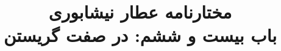 \documentclass[14pt,b5paper]{article}
\begin{document}
\title{\Huge مختارنامه عطار نیشابوری \\
باب بیست و ششم: در صفت گریستن}
\author{ }
\date{ }
\maketitle
\newpage
\tableofcontents
\newpage

\newpage

\newpage

\newpage

\newpage

\newpage

\newpage

\newpage

\newpage

\newpage

\newpage

\newpage

\newpage

\newpage

\newpage

\newpage

\newpage

\newpage

\newpage

\newpage

\newpage

\newpage

\newpage

\newpage

\newpage

\newpage

\newpage

\newpage

\newpage

\newpage

\newpage

\newpage

\newpage

\newpage

\newpage

\newpage

\newpage

\newpage

\newpage

\newpage

\newpage

\newpage

\newpage

\newpage

\newpage

\newpage

\newpage

\newpage
\end{document}
